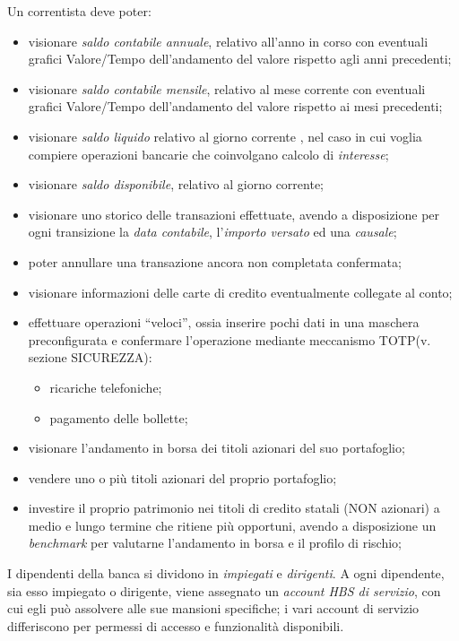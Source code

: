 Un correntista deve poter:
\begin{itemize} 
	\item visionare \emph{saldo contabile annuale}, relativo all'anno in corso con eventuali grafici Valore/Tempo dell'andamento del valore rispetto agli anni precedenti;
	\item visionare \emph{saldo contabile mensile}, relativo al mese corrente con eventuali grafici Valore/Tempo dell'andamento del valore rispetto ai mesi precedenti;
	\item visionare \emph{saldo liquido} relativo al giorno corrente , nel caso in cui voglia compiere operazioni bancarie che coinvolgano calcolo di \emph{interesse};
	\item visionare \emph{saldo disponibile}, relativo al giorno corrente;
	\item visionare uno storico delle transazioni effettuate, avendo a disposizione per ogni transizione la \emph{data contabile}, l'\emph{importo versato} ed una \emph{causale};
	\item poter annullare una transazione ancora non completata confermata;
	\item visionare informazioni delle carte di credito eventualmente collegate al conto;
	\item effettuare operazioni ``veloci'', ossia inserire pochi dati in una maschera preconfigurata e confermare l'operazione mediante meccanismo TOTP(v. sezione SICUREZZA):
	\begin{itemize}
			\item ricariche telefoniche;
			\item pagamento delle bollette;
	\end{itemize}
	\item visionare l'andamento in borsa dei titoli azionari del suo portafoglio;
	\item vendere uno o più titoli azionari del proprio portafoglio;
	\item investire il proprio patrimonio nei titoli di credito statali (NON azionari) a medio e lungo termine che ritiene più opportuni, avendo a disposizione un \emph{benchmark} per valutarne l'andamento in borsa e il profilo di rischio;
\end{itemize}	

I dipendenti della banca si dividono in \emph{impiegati} e \emph{dirigenti}. A ogni dipendente, sia esso impiegato o dirigente, viene assegnato un \emph{account HBS di servizio}, con cui egli può assolvere alle sue mansioni specifiche; i vari account di servizio differiscono per permessi di accesso e funzionalità disponibili.

